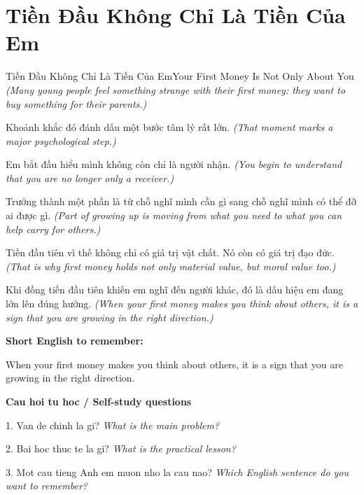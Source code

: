 \section{Tiền Đầu Không Chỉ Là Tiền Của Em}
\begin{truyen}{Tiền Đầu Không Chỉ Là Tiền Của Em}{Your First Money Is Not Only About You}
\textit{(Many young people feel something strange with their first money: they want to buy something for their parents.)}

Khoảnh khắc đó đánh dấu một bước tâm lý rất lớn.
\textit{(That moment marks a major psychological step.)}

Em bắt đầu hiểu mình không còn chỉ là người nhận.
\textit{(You begin to understand that you are no longer only a receiver.)}

Trưởng thành một phần là từ chỗ nghĩ mình cần gì sang chỗ nghĩ mình có thể đỡ ai được gì.
\textit{(Part of growing up is moving from what you need to what you can help carry for others.)}

Tiền đầu tiên vì thế không chỉ có giá trị vật chất. Nó còn có giá trị đạo đức.
\textit{(That is why first money holds not only material value, but moral value too.)}

\end{truyen}

\begin{baihoc}
Khi đồng tiền đầu tiên khiến em nghĩ đến người khác, đó là dấu hiệu em đang lớn lên đúng hướng.
\textit{(When your first money makes you think about others, it is a sign that you are growing in the right direction.)}
\end{baihoc}

\begin{ghinhoanh}
\textbf{Short English to remember:}

When your first money makes you think about others, it is a sign that you are growing in the right direction.

\end{ghinhoanh}

\begin{tuhocnhanh}
\textbf{Cau hoi tu hoc / Self-study questions}

1. Van de chinh la gi? \textit{What is the main problem?}

2. Bai hoc thuc te la gi? \textit{What is the practical lesson?}

3. Mot cau tieng Anh em muon nho la cau nao? \textit{Which English sentence do you want to remember?}
\end{tuhocnhanh}
\ngancach

